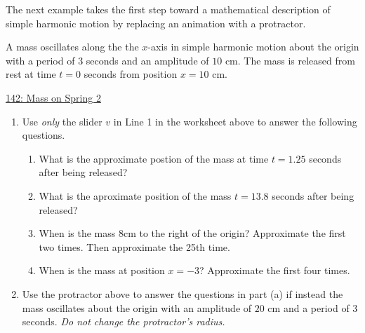 \documentclass{ximera}
\begin{document}
The next example takes the first step toward a mathematical description of simple harmonic motion by replacing an animation with a protractor.

\begin{example}  \label{Ex:PDoEr3rdfsx}
A mass oscillates along the the $x$-axis in simple harmonic motion  about the origin  with a period of $3$ seconds and an amplitude of $10$ cm. The mass is released from rest at time $t=0$ seconds from position $x=10$ cm.

\begin{onlineOnly}
    \begin{center}
\end{center}
\end{onlineOnly}

\href{https://www.desmos.com/calculator/rqdenajviu}{142: Mass on Spring 2 }

\begin{enumerate}

\item Use \emph{only} the slider $v$ in Line 1 in the worksheet above to answer the following questions.

\begin{enumerate}
\item What is the approximate postion of the mass at time $t=1.25$ seconds after being released?

\item What is the aproximate position of the mass $t=13.8$ seconds after being released?

\item When is the mass $8$cm to the right of the origin? Approximate the first two times. Then approximate the 25th time.

\item When is the mass  at position $x = -3$? Approximate the first four times.  
\end{enumerate}

\item Use the protractor above to answer the questions in part (a) if instead the mass oscillates about the origin with an amplitude of $20$ cm and a period of $3$ seconds. \emph{Do not change the protractor's radius.}



\end{enumerate}
\end{example}
\end{document}
